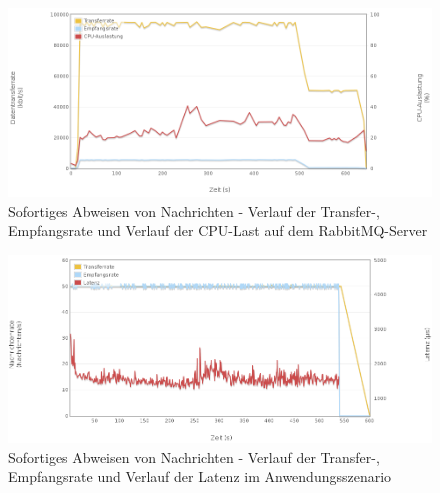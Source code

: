 \documentclass[	a4paper,
			11pt,
			oneside,
			parskip]{scrartcl}
\begin{document}
		\begin{figure}[!htb]
			\centering
			\includegraphics[width=\textwidth]{img/reject/reject_server2.png}
			\caption{Sofortiges Abweisen von Nachrichten - Verlauf der Transfer-, Empfangsrate und Verlauf der CPU-Last auf dem RabbitMQ-Server}
			\label{fig:reject-server2}
		\end{figure}
		
		\begin{figure}[!htb]
			\centering
			\includegraphics[width=\textwidth]{img/reject/reject_scenario.png}
			\caption{Sofortiges Abweisen von Nachrichten - Verlauf der Transfer-, Empfangsrate und Verlauf der Latenz im Anwendungsszenario}
			\label{fig:reject-scenario}
		\end{figure}
	
\end{document}
